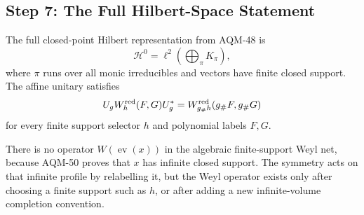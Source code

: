\subsection{Step 7: The Full Hilbert-Space Statement}
The full closed-point Hilbert representation from AQM-48 is
\[
  \mathcal H^0=\ell^2\!\left(\bigoplus_{\pi}K_\pi\right),
\]
where \(\pi\) runs over all monic irreducibles and vectors have finite closed
support.  The affine unitary satisfies
\[
  U_gW_h^{\rm red}(F,G)U_g^*=W_{g_\#h}^{\rm red}(g_\#F,g_\#G)
\]
for every finite support selector \(h\) and polynomial labels \(F,G\).

There is no operator \(W(\operatorname{ev}(x))\) in the algebraic
finite-support Weyl net, because AQM-50 proves that \(x\) has infinite closed
support.  The symmetry acts on that infinite profile by relabelling it, but
the Weyl operator exists only after choosing a finite support such as \(h\), or
after adding a new infinite-volume completion convention.
